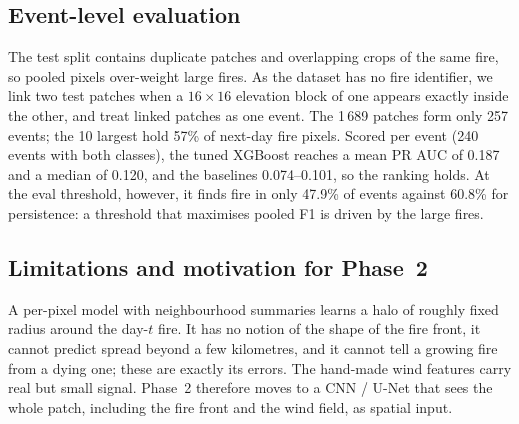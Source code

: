 \subsection{Event-level evaluation}
\label{sec:events}

The test split contains duplicate patches and overlapping crops of the same fire, so pooled pixels over-weight large
fires. As the dataset has no fire identifier, we link two test patches when a $16\times16$ elevation block of one
appears exactly inside the other, and treat linked patches as one event. The 1\,689 patches form only 257 events; the 10
largest hold 57\% of next-day fire pixels. Scored per event (240 events with both classes), the tuned XGBoost reaches a
mean PR AUC of 0.187 and a median of 0.120, and the baselines 0.074--0.101, so the ranking holds. At the eval threshold,
however, it finds fire in only 47.9\% of events against 60.8\% for persistence: a threshold that maximises pooled F1 is
driven by the large fires.

\subsection{Limitations and motivation for Phase~2}
A per-pixel model with neighbourhood summaries learns a halo of roughly fixed radius around the day-$t$ fire. It has no
notion of the shape of the fire front, it cannot predict spread beyond a few kilometres, and it cannot tell a growing
fire from a dying one; these are exactly its errors. The hand-made wind features carry real but small signal.
Phase~2 therefore moves to a CNN / U-Net that sees the whole patch, including the fire front and the wind field,
as spatial input.
